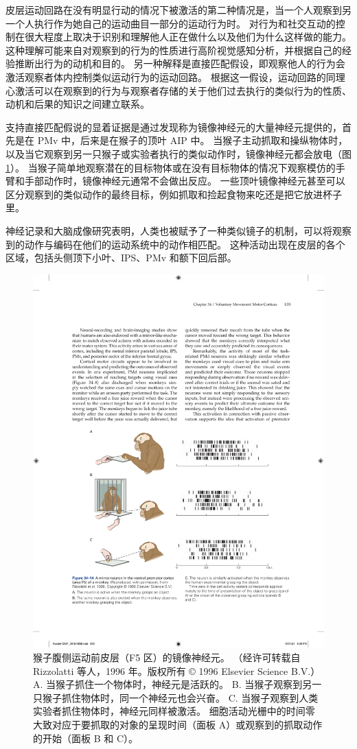 皮层运动回路在没有明显行动的情况下被激活的第二种情况是，当一个人观察到另一个人执行作为她自己的运动曲目一部分的运动行为时。 对行为和社交互动的控制在很大程度上取决于识别和理解他人正在做什么以及他们为什么这样做的能力。 这种理解可能来自对观察到的行为的性质进行高阶视觉感知分析，并根据自己的经验推断出行为的动机和目的。 另一种解释是直接匹配假设，即观察他人的行为会激活观察者体内控制类似运动行为的运动回路。 根据这一假设，运动回路的同理心激活可以在观察到的行为与观察者存储的关于他们过去执行的类似行为的性质、动机和后果的知识之间建立联系。

支持直接匹配假说的显着证据是通过发现称为镜像神经元的大量神经元提供的，首先是在 PMv 中，后来是在猴子的顶叶 AIP 中。 
当猴子主动抓取和操纵物体时，以及当它观察到另一只猴子或实验者执行的类似动作时，镜像神经元都会放电（图\ref{fig:34_14}）。
当猴子简单地观察潜在的目标物体或在没有目标物体的情况下观察模仿的手臂和手部动作时，镜像神经元通常不会做出反应。 
一些顶叶镜像神经元甚至可以区分观察到的类似动作的最终目标，例如抓取和捡起食物来吃还是把它放进杯子里。

神经记录和大脑成像研究表明，人类也被赋予了一种类似镜子的机制，可以将观察到的动作与编码在他们的运动系统中的动作相匹配。 这种活动出现在皮层的各个区域，包括头侧顶下小叶、IPS、PMv 和额下回后部。

\begin{figure}[htbp]
	\centering
	\includegraphics[width=0.8\linewidth]{chap34/fig_34_14}
	\caption{猴子腹侧运动前皮层（F5 区）的镜像神经元。 （经许可转载自 Rizzolatti 等人，1996 年。版权所有 © 1996 Elsevier Science B.V.） A. 当猴子抓住一个物体时，神经元是活跃的。 B. 当猴子观察到另一只猴子抓住物体时，同一个神经元也会兴奋。 C. 当猴子观察到人类实验者抓住物体时，神经元同样被激活。 细胞活动光栅中的时间零大致对应于要抓取的对象的呈现时间（面板 A）或观察到的抓取动作的开始（面板 B 和 C）。}
	\label{fig:34_14}
\end{figure}

